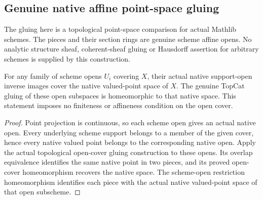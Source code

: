 \subsection{Genuine native affine point-space gluing}
\label{subsec:native-scheme-atlas}

The gluing here is a topological point-space comparison for actual Mathlib
schemes. The pieces and their section rings are genuine scheme affine opens.
No analytic structure sheaf, coherent-sheaf gluing or Hausdorff assertion for
arbitrary schemes is supplied by this construction.

\begin{theorem}
\label{scheme:native-open-cover-gluing}
\leanok
{}
For any family of scheme opens $U_i$ covering $X$, their actual native
support-open inverse images cover the native valued-point space of $X$.
The genuine TopCat gluing of these open subspaces is homeomorphic to that
native space. This statement imposes no finiteness or affineness condition
on the open cover.
\end{theorem}
\begin{proof}
Point projection is continuous, so each scheme open gives an actual native
open. Every underlying scheme support belongs to a member of the given
cover, hence every native valued point belongs to the corresponding native
open. Apply the actual topological open-cover gluing construction to these
opens. Its overlap equivalence identifies the same native point in two
pieces, and its proved open-cover homeomorphism recovers the native space.
The scheme-open restriction homeomorphism identifies each piece with the
actual native valued-point space of that open subscheme.
\end{proof}

